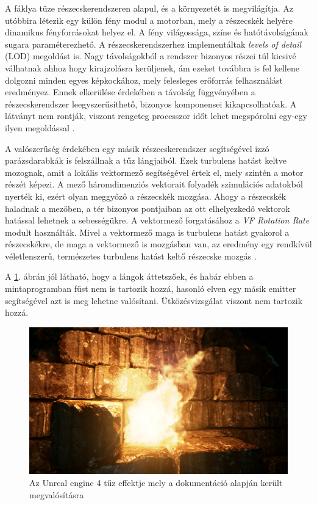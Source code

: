 A fáklya tüze részecskerendszeren alapul, és a környezetét is megvilágítja. Az utóbbira létezik egy külön fény modul a motorban, mely a részecskék helyére dinamikus fényforrásokat helyez el. A fény világossága, színe és hatótávolságának sugara paraméterezhető. A részecskerendszerhez implementáltak \textit{levels of detail} (LOD) megoldást is. Nagy távolságokból a rendszer bizonyos részei túl kicsivé válhatnak ahhoz hogy kirajzolásra kerüljenek, ám ezeket továbbra is fel kellene dolgozni minden egyes képkockához, mely felesleges erőforrás felhasználást eredményez. Ennek elkerülése érdekében a távolság függvényében a részecskerendszer leegyszerűsíthető, bizonyos komponensei kikapcsolhatóak. A látványt nem rontják, viszont rengeteg processzor időt lehet megspórolni egy-egy ilyen megoldással \cite{UEngineFireExample}.

A valószerűség érdekében egy másik részecskerendszer segítségével izzó parázsdarabkák is felszállnak a tűz lángjaiból. Ezek turbulens hatást keltve mozognak, amit a lokális vektormező segítségével értek el, mely szintén a motor részét képezi. A mező háromdimenziós vektorait folyadék szimulációs adatokból nyerték ki, ezért olyan meggyőző a részecskék mozgása. Ahogy a részecskék haladnak a mezőben, a tér bizonyos pontjaiban az ott elhelyezkedő vektorok hatással lehetnek a sebességükre. A vektormező forgatásához a \textit{VF Rotation Rate} modult használták. Mivel a vektormező maga is turbulens hatást gyakorol a részecskékre, de maga a vektormező is mozgásban van, az eredmény egy rendkívül véletlenszerű, természetes turbulens hatást keltő részecske mozgás \cite{UEngineFireExample}.

A \ref{fig:UE4fire}. ábrán jól látható, hogy a lángok áttetszőek, és habár ebben a mintaprogramban füst nem is tartozik hozzá, hasonló elven egy másik emitter segítségével azt is meg lehetne valósítani. Ütközésvizsgálat viszont nem tartozik hozzá.

\begin{figure}[h]
\centering
\includegraphics[width=\textwidth]{kepek/UE4flame.png}
\caption{Az Unreal engine 4 tűz effektje mely a dokumentáció alapján került megvalósításra \cite{UEngineFireExample}}
\label{fig:UE4fire}
\end{figure}

